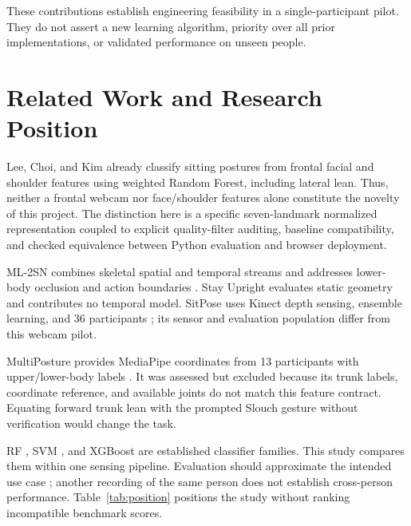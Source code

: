 \documentclass[conference]{IEEEtran}
\begin{document}
These contributions establish engineering feasibility in a single-participant pilot. They do not assert a new learning algorithm, priority over all prior implementations, or validated performance on unseen people.

\section{Related Work and Research Position}
Lee, Choi, and Kim \cite{weightedrf} already classify sitting postures from frontal facial and shoulder features using weighted Random Forest, including lateral lean. Thus, neither a frontal webcam nor face/shoulder features alone constitute the novelty of this project. The distinction here is a specific seven-landmark normalized representation coupled to explicit quality-filter auditing, baseline compatibility, and checked equivalence between Python evaluation and browser deployment.

ML-2SN combines skeletal spatial and temporal streams and addresses lower-body occlusion and action boundaries \cite{ml2sn}. Stay Upright evaluates static geometry and contributes no temporal model. SitPose uses Kinect depth sensing, ensemble learning, and 36 participants \cite{sitpose}; its sensor and evaluation population differ from this webcam pilot.

MultiPosture provides MediaPipe coordinates from 13 participants with upper/lower-body labels \cite{multiposture}. It was assessed but excluded because its trunk labels, coordinate reference, and available joints do not match this feature contract. Equating forward trunk lean with the prompted Slouch gesture without verification would change the task.

RF \cite{rf}, SVM \cite{svm}, and XGBoost \cite{xgb} are established classifier families. This study compares them within one sensing pipeline. Evaluation should approximate the intended use case \cite{saeb}; another recording of the same person does not establish cross-person performance. Table~\ref{tab:position} positions the study without ranking incompatible benchmark scores.
\end{document}
